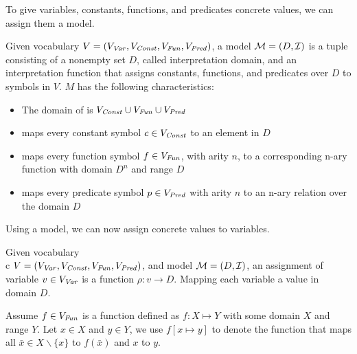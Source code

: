 To give variables, constants, functions, and predicates concrete values, we can assign them a model.
\begin{mydef}[Model]
	Given vocabulary $V = (V_{\mathit{Var}}, V_{\mathit{Const}}, V_{\mathit{Fun}}, V_{\mathit{Pred}})$, a model $\mathcal{M} = (D, \mathcal{I})$ is a tuple consisting of a nonempty set $D$, called interpretation domain, and an interpretation function \interpret that assigns constants, functions, and predicates over $D$ to symbols in $V$. $M$ has the following characteristics:
	\begin{itemize}
		\item The domain of \interpret is $V_{\mathit{Const}} \cup V_{\mathit{Fun}} \cup V_{\mathit{Pred}}$
		\item \interpret maps every constant symbol $c \in V_{\mathit{Const}}$ to an element in $D$
		\item \interpret maps every function symbol $f \in V_{\mathit{Fun}}$, with arity $n$, to a corresponding n-ary function with domain $D^n$ and range $D$
		\item \interpret maps every predicate symbol $p \in V_{\mathit{Pred}}$ with arity $n$ to an n-ary relation over the domain $D$
	\end{itemize}
\end{mydef}
Using a model, we can now assign concrete values to variables.
\begin{mydef}
	Given vocabulary \\c $V = (V_{\mathit{Var}}, V_{\mathit{Const}}, V_{\mathit{Fun}}, V_{\mathit{Pred}})$, and model $\mathcal{M} = (D, \mathcal{I})$, an assignment of variable $v \in V_{\mathit{Var}}$ is a function $\rho: v \rightarrow D$. Mapping each variable a value in domain $D$.
\end{mydef}
Assume $f \in V_{\mathit{Fun}}$ is a function defined as $f: X \mapsto Y$ with some domain $X$ and range $Y$. Let $x \in X$ and $y \in Y$, we use $f[x \mapsto y]$  to denote the function that maps all $\bar{x} \in X \backslash \{ x \}$ to $f(\bar{x})$ and $x$ to $y$.

